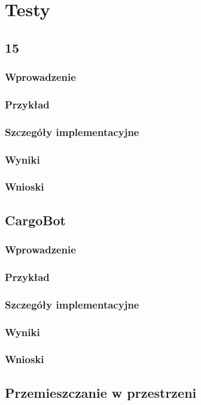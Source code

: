 \chapter{Testy}
\thispagestyle{chapterBeginStyle}

\section{15}
    \subsection{Wprowadzenie}
    \subsection{Przykład}
    \subsection{Szczegóły implementacyjne}
    \subsection{Wyniki}
    \subsection{Wnioski}
\section{CargoBot}
    \subsection{Wprowadzenie}
    \subsection{Przykład}
    \subsection{Szczegóły implementacyjne}
    \subsection{Wyniki}
    \subsection{Wnioski}
\section{Przemieszczanie w przestrzeni}
